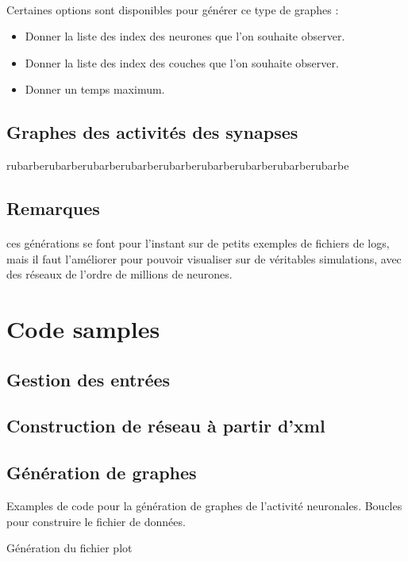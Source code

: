 \documentclass[a4paper,10pt]{article}
\begin{document}
\paragraph{}
Certaines options sont disponibles pour générer ce type de graphes :
\begin{itemize}
\item{Donner la liste des index des neurones que l’on souhaite observer.}
\item{Donner la liste des index des couches que l’on souhaite observer.}
\item{Donner un temps maximum.}
\end{itemize}

\subsection{Graphes des activités des synapses}

rubarberubarberubarberubarberubarberubarberubarberubarberubarbe

\subsection*{Remarques}
\paragraph{}
ces générations se font pour l’instant sur de petits exemples de fichiers de logs, mais il faut l’améliorer pour pouvoir visualiser sur de véritables simulations, avec des réseaux de l’ordre de millions de neurones.

\appendix
\section{Code samples}

\subsection{Gestion des entrées}
\subsection{Construction de réseau à partir d'xml}
\subsection{Génération de graphes}

Examples de code pour la génération de graphes de l'activité neuronales.
Boucles pour construire le fichier de données.

Génération du fichier plot

\end{document}
